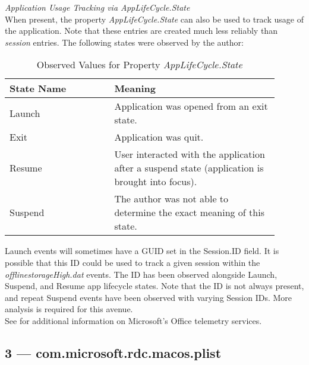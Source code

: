 \documentclass[journal]{IEEEtran}
\begin{document}
\noindent\textit{Application Usage Tracking via AppLifeCycle.State}\\

When present, the property \textit{AppLifeCycle.State} can also be used to track usage of the application. Note that these entries are created much less reliably than \textit{session} entries. The following states were observed by the author:

\begin{table}[h!]
\caption{Observed Values for Property \textit{AppLifeCycle.State}}
\begin{tabular}{p{0.35\linewidth} | p{0.55\linewidth}}
\textbf{State Name} & \textbf{Meaning}                                            \\ \hline
Launch              & Application was opened from an exit state.                  \\
Exit                & Application was quit.                                       \\
Resume              & User interacted with the application after a suspend state (application is brought into focus). \\
Suspend             & The author was not able to determine the exact meaning of this state.     
\end{tabular}
\end{table}

Launch events will sometimes have a GUID set in the Session.ID field. It is possible that this ID could be used to track a given session within the \textit{offlinestorageHigh.dat} events. The ID has been observed alongside Launch, Suspend, and Resume app lifecycle states. Note that the ID is not always present, and repeat Suspend events have been observed with varying Session IDs. More analysis is required for this avenue.\\

See \cite{nas_dpia_2019} for additional information on Microsoft’s Office telemetry services.

\subsection{3 — com.microsoft.rdc.macos.plist}
\end{document}
